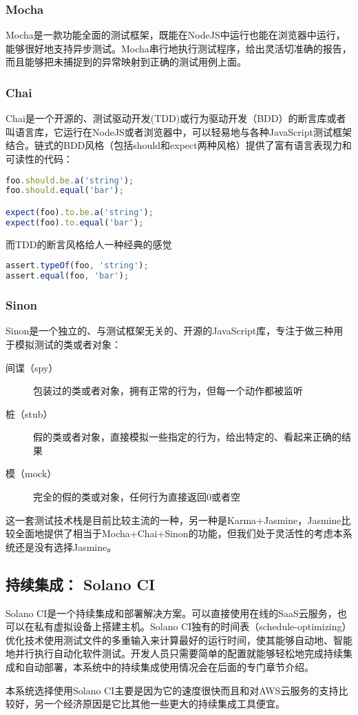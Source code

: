 \subsubsection{Mocha}
Mocha是一款功能全面的测试框架，既能在NodeJS中运行也能在浏览器中运行，能够很好地支持异步测试。Mocha串行地执行测试程序，给出灵活切准确的报告，而且能够把未捕捉到的异常映射到正确的测试用例上面。

\subsubsection{Chai}
Chai是一个开源的、测试驱动开发(TDD)或行为驱动开发（BDD）的断言库或者叫语言库，它运行在NodeJS或者浏览器中，可以轻易地与各种JavaScript测试框架结合。链式的BDD风格（包括should和expect两种风格）提供了富有语言表现力和可读性的代码：

\begin{lstlisting}[language={JavaScript}, caption={BDD风格的chai代码}]
foo.should.be.a('string');
foo.should.equal('bar');

expect(foo).to.be.a('string');
expect(foo).to.equal('bar');
\end{lstlisting}
而TDD的断言风格给人一种经典的感觉
\begin{lstlisting}[language={JavaScript}, caption={经典的断言风格}]
assert.typeOf(foo, 'string');
assert.equal(foo, 'bar');
\end{lstlisting}

\subsubsection{Sinon}
Sinon是一个独立的、与测试框架无关的、开源的JavaScript库，专注于做三种用于模拟测试的类或者对象：
\begin{description}
  \item[间谍（spy）] 包装过的类或者对象，拥有正常的行为，但每一个动作都被监听
  \item[桩（stub）] 假的类或者对象，直接模拟一些指定的行为，给出特定的、看起来正确的结果
  \item[模（mock）] 完全的假的类或对象，任何行为直接返回0或者空
\end{description}

这一套测试技术栈是目前比较主流的一种，另一种是Karma+Jasmine，Jasmine比较全面地提供了相当于Mocha+Chai+Sinon的功能，但我们处于灵活性的考虑本系统还是没有选择Jasmine。

\subsection{持续集成： Solano CI}
Solano CI是一个持续集成和部署解决方案。可以直接使用在线的SaaS云服务，也可以在私有虚拟设备上搭建主机。Solano CI独有的时间表（schedule-optimizing）优化技术使用测试文件的多重输入来计算最好的运行时间，使其能够自动地、智能地并行执行自动化软件测试。开发人员只需要简单的配置就能够轻松地完成持续集成和自动部署，本系统中的持续集成使用情况会在后面的专门章节介绍。

本系统选择使用Solano CI主要是因为它的速度很快而且和对AWS云服务的支持比较好，另一个经济原因是它比其他一些更大的持续集成工具便宜。

